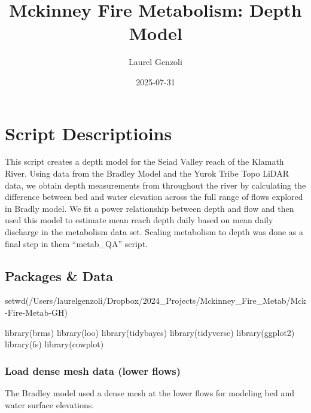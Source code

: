 \documentclass[
  letterpaper,
  DIV=11,
  numbers=noendperiod]{scrartcl}
\title{Mckinney Fire Metabolism: Depth Model}
\author{Laurel Genzoli}
\date{2025-07-31}
\newenvironment{Shaded}{\begin{snugshade}}{\end{snugshade}}
\newcommand{\FunctionTok}[1]{\textcolor[rgb]{0.28,0.35,0.67}{#1}}
\newcommand{\NormalTok}[1]{\textcolor[rgb]{0.00,0.23,0.31}{#1}}
\newcommand{\StringTok}[1]{\textcolor[rgb]{0.13,0.47,0.30}{#1}}
\renewcommand*\contentsname{Table of contents}
\newcommand\contentsname{Table of contents}
\begin{document}
\maketitle

\renewcommand*\contentsname{Table of contents}
{
\hypersetup{linkcolor=}
\setcounter{tocdepth}{3}
\tableofcontents
}

\section{Script Descriptioins}\label{script-descriptioins}

This script creates a depth model for the Seiad Valley reach of the
Klamath River. Using data from the Bradley Model and the Yurok Tribe
Topo LiDAR data, we obtain depth measurements from throughout the river
by calculating the difference between bed and water elevation across the
full range of flows explored in Bradly model. We fit a power
relationship between depth and flow and then used this model to estimate
mean reach depth daily based on mean daily discharge in the metabolism
data set. Scaling metabolism to depth was done as a final step in them
``metab\_QA'' script.

\subsection{Packages \& Data}\label{packages-data}

\begin{Shaded}
\begin{Highlighting}[]
\FunctionTok{setwd}\NormalTok{(}\StringTok{\textquotesingle{}/Users/laurelgenzoli/Dropbox/2024\_Projects/Mckinney\_Fire\_Metab/Mck{-}Fire{-}Metab{-}GH\textquotesingle{}}\NormalTok{)}

\FunctionTok{library}\NormalTok{(brms)}
\FunctionTok{library}\NormalTok{(loo)}
\FunctionTok{library}\NormalTok{(tidybayes)}
\FunctionTok{library}\NormalTok{(tidyverse)}
\FunctionTok{library}\NormalTok{(ggplot2)}
\FunctionTok{library}\NormalTok{(fs)}
\FunctionTok{library}\NormalTok{(cowplot)}
\end{Highlighting}
\end{Shaded}

\subsubsection{Load dense mesh data (lower
flows)}\label{load-dense-mesh-data-lower-flows}

The Bradley model used a dense mesh at the lower flows for modeling bed
and water surface elevations.
\end{document}
